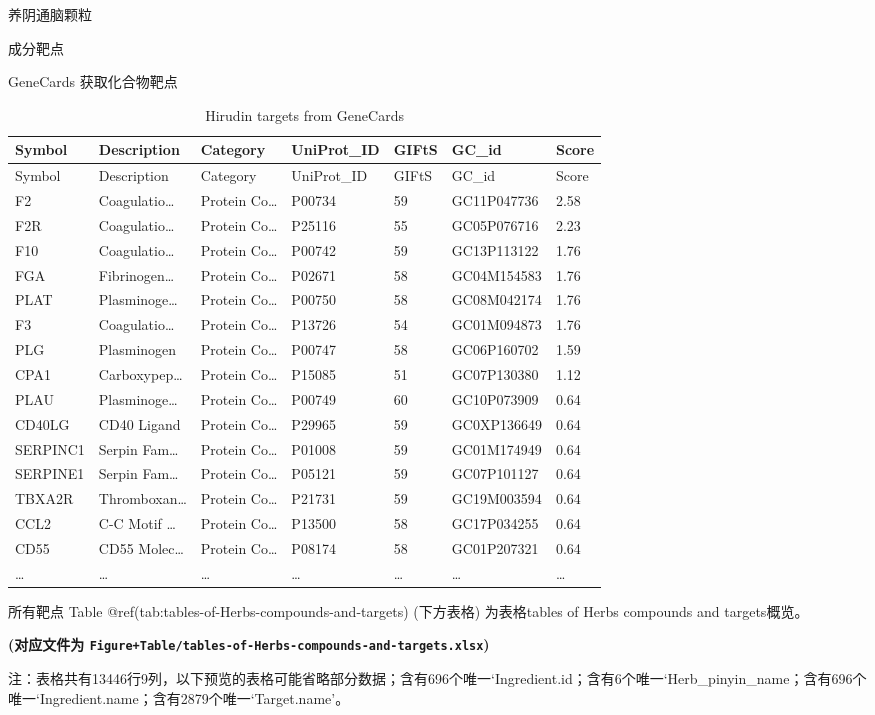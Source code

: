 \documentclass[
  ignorenonframetext,
]{beamer}
\begin{document}
\begin{frame}[fragile]{养阴通脑颗粒}
\begin{block}{成分靶点}
\begin{block}{GeneCards 获取化合物靶点}
\begin{longtable}[]{@{}lllllll@{}}
\caption{Hirudin targets from GeneCards}\tabularnewline
\toprule
Symbol & Description & Category & UniProt\_ID & GIFtS & GC\_id &
Score\tabularnewline
\midrule
\endfirsthead
\toprule
Symbol & Description & Category & UniProt\_ID & GIFtS & GC\_id &
Score\tabularnewline
\midrule
\endhead
F2 & Coagulatio\ldots{} & Protein Co\ldots{} & P00734 & 59 & GC11P047736
& 2.58\tabularnewline
F2R & Coagulatio\ldots{} & Protein Co\ldots{} & P25116 & 55 &
GC05P076716 & 2.23\tabularnewline
F10 & Coagulatio\ldots{} & Protein Co\ldots{} & P00742 & 59 &
GC13P113122 & 1.76\tabularnewline
FGA & Fibrinogen\ldots{} & Protein Co\ldots{} & P02671 & 58 &
GC04M154583 & 1.76\tabularnewline
PLAT & Plasminoge\ldots{} & Protein Co\ldots{} & P00750 & 58 &
GC08M042174 & 1.76\tabularnewline
F3 & Coagulatio\ldots{} & Protein Co\ldots{} & P13726 & 54 & GC01M094873
& 1.76\tabularnewline
PLG & Plasminogen & Protein Co\ldots{} & P00747 & 58 & GC06P160702 &
1.59\tabularnewline
CPA1 & Carboxypep\ldots{} & Protein Co\ldots{} & P15085 & 51 &
GC07P130380 & 1.12\tabularnewline
PLAU & Plasminoge\ldots{} & Protein Co\ldots{} & P00749 & 60 &
GC10P073909 & 0.64\tabularnewline
CD40LG & CD40 Ligand & Protein Co\ldots{} & P29965 & 59 & GC0XP136649 &
0.64\tabularnewline
SERPINC1 & Serpin Fam\ldots{} & Protein Co\ldots{} & P01008 & 59 &
GC01M174949 & 0.64\tabularnewline
SERPINE1 & Serpin Fam\ldots{} & Protein Co\ldots{} & P05121 & 59 &
GC07P101127 & 0.64\tabularnewline
TBXA2R & Thromboxan\ldots{} & Protein Co\ldots{} & P21731 & 59 &
GC19M003594 & 0.64\tabularnewline
CCL2 & C-C Motif \ldots{} & Protein Co\ldots{} & P13500 & 58 &
GC17P034255 & 0.64\tabularnewline
CD55 & CD55 Molec\ldots{} & Protein Co\ldots{} & P08174 & 58 &
GC01P207321 & 0.64\tabularnewline
\ldots{} & \ldots{} & \ldots{} & \ldots{} & \ldots{} & \ldots{} &
\ldots{}\tabularnewline
\bottomrule
\end{longtable}
\end{block}

\begin{block}{所有靶点}
\protect\hypertarget{ux6240ux6709ux9776ux70b9}{}
Table @ref(tab:tables-of-Herbs-compounds-and-targets) (下方表格)
为表格tables of Herbs compounds and targets概览。

\textbf{(对应文件为
\texttt{Figure+Table/tables-of-Herbs-compounds-and-targets.xlsx})}

\begin{center}\begin{tcolorbox}[colback=gray!10, colframe=gray!50, width=0.9\linewidth, arc=1mm, boxrule=0.5pt]注：表格共有13446行9列，以下预览的表格可能省略部分数据；含有696个唯一`Ingredient.id；含有6个唯一`Herb\_pinyin\_name；含有696个唯一`Ingredient.name；含有2879个唯一`Target.name'。
\end{tcolorbox}
\end{center}


\end{block}
\end{block}
\end{frame}
\end{document}
